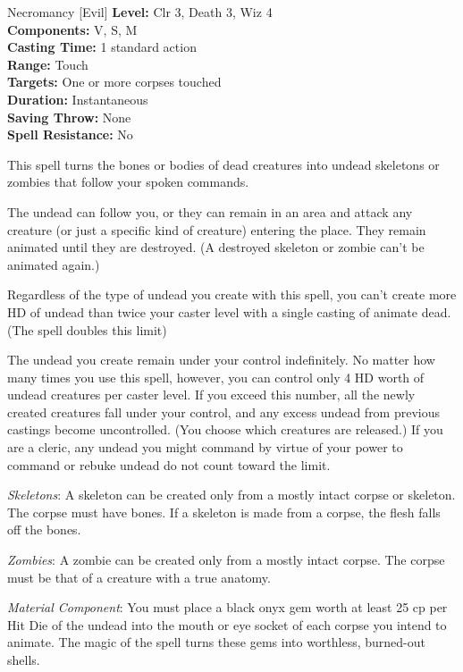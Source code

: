 {Necromancy [Evil]}
{
	\textbf{Level:}
	Clr 3, Death 3, Wiz 4\\
	\textbf{Components:}
	V, S, M\\
	\textbf{Casting Time:}
	1 standard action\\
	\textbf{Range:}
	Touch\\
	\textbf{Targets:}
	One or more corpses touched\\
	\textbf{Duration:}
	Instantaneous\\
	\textbf{Saving Throw:}
	None\\
	\textbf{Spell Resistance:}
	No\\
}
{
	This spell turns the bones or bodies of dead creatures into undead skeletons or zombies that follow your spoken commands.

	The undead can follow you, or they can remain in an area and attack any creature (or just a specific kind of creature) entering the place. They remain animated until they are destroyed. (A destroyed skeleton or zombie can't be animated again.)

	Regardless of the type of undead you create with this spell, you can't create more HD of undead than twice your caster level with a single casting of animate dead. (The  spell doubles this limit)

	The undead you create remain under your control indefinitely. No matter how many times you use this spell, however, you can control only 4 HD worth of undead creatures per caster level. If you exceed this number, all the newly created creatures fall under your control, and any excess undead from previous castings become uncontrolled. (You choose which creatures are released.) If you are a cleric, any undead you might command by virtue of your power to command or rebuke undead do not count toward the limit.

	\textit{Skeletons}:
	A skeleton can be created only from a mostly intact corpse or skeleton. The corpse must have bones. If a skeleton is made from a corpse, the flesh falls off the bones.

	\textit{Zombies}:
	A zombie can be created only from a mostly intact corpse. The corpse must be that of a creature with a true anatomy.

	\textit{Material Component}:
	You must place a black onyx gem worth at least 25 cp per Hit Die of the undead into the mouth or eye socket of each corpse you intend to animate. The magic of the spell turns these gems into worthless, burned-out shells.

}
